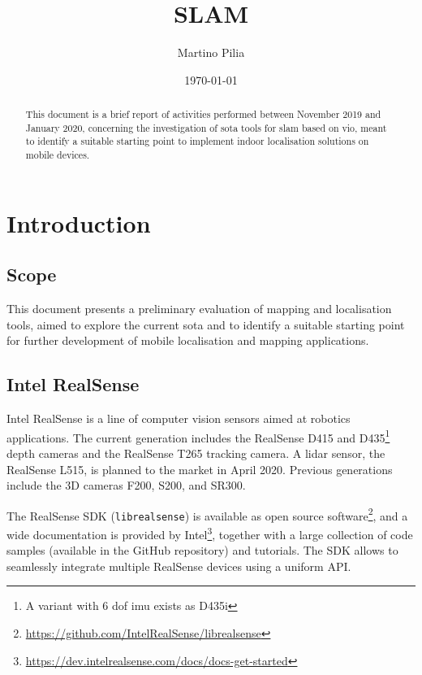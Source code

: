 \documentclass[11pt, letterpaper, twoside]{article}
\title{SLAM}
\author{Martino Pilia}
\date{\today}
\begin{document}
\maketitle

\begin{abstract}
    This document is a brief report of activities performed between November 2019
    and January 2020, concerning the investigation of \gls{sota} tools
    for \gls{slam} based on \gls{vio}, meant to identify a suitable starting point
    to implement indoor localisation solutions on mobile devices.
\end{abstract}

\tableofcontents

\glsfindwidesttoplevelname[\acronymtype]
\printglossary[type=\acronymtype,style=alttree,title=Abbreviations,nonumberlist]

\newpage

\section{Introduction}

\subsection{Scope}

This document presents a preliminary evaluation of mapping and localisation
tools, aimed to explore the current \gls{sota} and to identify a suitable
starting point for further development of mobile localisation and mapping
applications.

\subsection{Intel RealSense}

Intel RealSense is a line of computer vision sensors aimed at robotics
applications. The current generation includes the RealSense D415 and
D435\footnote{A variant with 6 \gls{dof} \gls{imu} exists as D435i} depth
cameras and the RealSense T265 tracking camera. A lidar sensor, the RealSense
L515, is planned to the market in April 2020. Previous generations include the
3D cameras F200, S200, and SR300.

The RealSense SDK (\texttt{librealsense}) is available as open source
software\footnote{\url{https://github.com/IntelRealSense/librealsense}}, and a
wide documentation is provided by
Intel\footnote{\url{https://dev.intelrealsense.com/docs/docs-get-started}},
together with a large collection of code samples (available in the GitHub
repository) and tutorials. The SDK allows to seamlessly integrate multiple
RealSense devices using a uniform API.
\end{document}
